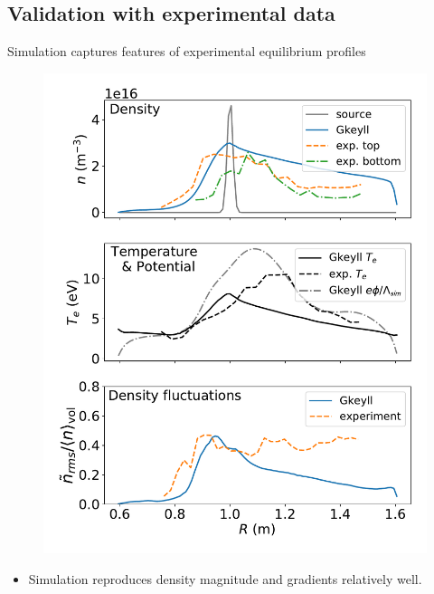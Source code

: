 \documentclass[12pt,table]{beamer}
\begin{document}
\subsection{Validation with experimental data}
\begin{frame}{Simulation captures features of experimental equilibrium profiles}
\begin{minipage}{.5\linewidth}
\begin{figure}
    \centering
    \includegraphics[width=\linewidth]{figs/eqprof-sw.pdf}
    \label{fig:my_label}
\end{figure}
\end{minipage}%
\begin{minipage}{.5\linewidth}
\begin{itemize}
\scriptsize
    \vspace{-1cm}
    \item Simulation reproduces density magnitude and gradients relatively well.

\end{itemize}
\end{minipage}
\end{frame}
\end{document}
